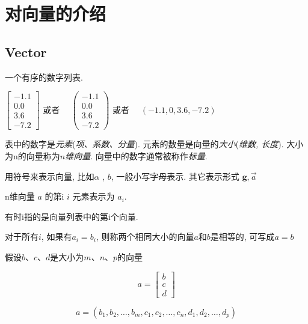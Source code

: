 \chapter{对向量的介绍}

\section{Vector}

\begin{definition}[Vector]
    一个有序的数字列表.

    \( \left[\begin{array}{c}-1.1 \\ 0.0 \\ 3.6 \\ -7.2\end{array}\right] \) 或者 \( \quad\left(\begin{array}{c}-1.1 \\ 0.0 \\ 3.6 \\ -7.2\end{array}\right) \) 或者 \( \quad(-1.1,0,3.6,-7.2) \)
\end{definition}

表中的数字是\textit{元素}(\textit{项、系数、分量}). 元素的数量是向量的\textit{大小}(\textit{维数, 长度}). 大小为n的向量称为\textit{$n$维向量}. 
向量中的数字通常被称作\textit{标量}. 

用符号来表示向量, 比如$\alpha$ , $b$, 一般小写字母表示. 其它表示形式 $\boldsymbol{g}, \vec{a}$

\begin{definition}[n维向量 \( a \) 的第 \( i \) 元素]
    n维向量 \( a \) 的第i \( i \) 元素表示为 \( a_{i} \).

    有时i指的是向量列表中的第i个向量.
\end{definition}

\begin{definition}[$a=b$]
    对于所有$i$, 如果有$a_i = b_i$, 则称两个相同大小的向量$a$和$b$是相等的, 可写成$a = b$
\end{definition}

\begin{definition}
    假设$b$、$c$、$d$是大小为$m$、$n$、$p$的向量
    
    $$ a=\left[\begin{array}{l}b \\ c \\ d\end{array}\right] $$

    $$ a=\left(b_{1}, b_{2}, \ldots, b_{m}, c_{1}, c_{2}, \ldots, c_{n}, d_{1}, d_{2}, \ldots, d_{p}\right) $$
\end{definition}

